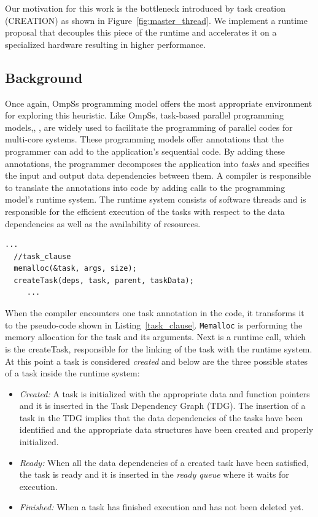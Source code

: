 Our motivation for this work is the bottleneck introduced by task creation (CREATION) as shown in Figure~\ref{fig:master_thread}.
We implement a runtime proposal that decouples this piece of the runtime and accelerates it on a specialized hardware resulting in higher performance.

\subsection{Background}

Once again, OmpSs programming model offers the most appropriate environment for exploring this heuristic.
Like OmpSs, task-based parallel programming models\cite{OpenMP4.0:Manual2013},\cite{OmpSs_PPL11}, \cite{OmpSs},  are widely used to facilitate the programming of parallel codes for multi-core systems.
These programming models offer annotations that the programmer can add to the application's sequential code. 
By adding these annotations, the programmer decomposes the application into \textit{tasks} and specifies the input and output data dependencies between them. 
A compiler is responsible to translate the annotations into code by adding calls to the programming model's runtime system. 
The runtime system consists of software threads and is responsible for the efficient execution of the tasks with respect to the data dependencies as well as the availability of resources.
\begin{lstlisting}[float, emph={void,if,return,non_critical_queue, critical_queue,not,true,and,break}, captionpos=b, caption={Compiler generated pseudo-code equivalence for task annotation.},label=task_clause, emph={[2]mat}, emphstyle={[2]}, aboveskip={0\baselineskip}, frame=tb, belowskip={0\baselineskip}]
     ...
  //task_clause
  memalloc(&task, args, size);
  createTask(deps, task, parent, taskData);
     ...
\end{lstlisting}

When the compiler encounters one task annotation in the code, it transforms it to the pseudo-code shown in Listing~\ref{task_clause}.
\texttt{Memalloc} is performing the memory allocation for the task and its arguments.
Next is a runtime call, which is the createTask, responsible for the linking of the task with the runtime system.
At this point a task is considered \textit{created} and below are the three possible states of a task inside the runtime system:
\begin{itemize}
\item \textit{Created:} A task is initialized with the appropriate data and function pointers and it is inserted in the Task Dependency Graph (TDG). The insertion of a task in the TDG implies that the data dependencies of the tasks have been identified and the appropriate data structures have been created and properly initialized. 
\item \textit{Ready:} When all the data dependencies of a created task have been satisfied, the task is ready and it is inserted in the \textit{ready queue} where it waits for execution. 
\item \textit{Finished:} When a task has finished execution and has not been deleted yet.
\end{itemize}


